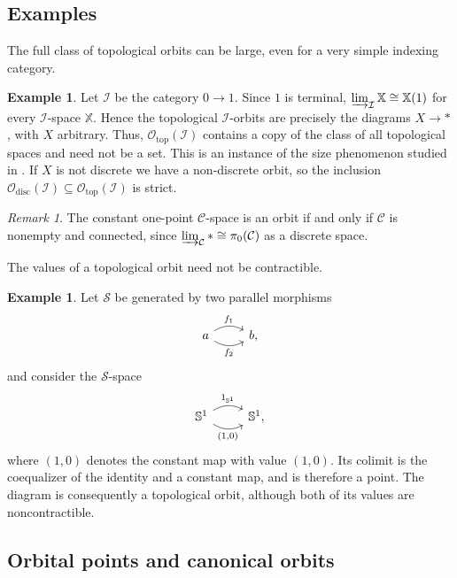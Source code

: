 \documentclass[12pt]{amsart}
\theoremstyle{definition}
\newtheorem{ex}[teo]{Example}
\theoremstyle{remark}
\newtheorem{rem}{Remark}
\numberwithin{figure}{section}%
\newcommand{\CC}{\mathcal{C}}
\newcommand{\X}{\mathbb{X}}
\begin{document}
\subsection{Examples}

The full class of topological orbits can be large, even for a very simple
indexing category.

\begin{ex}\label{ex:interval}
Let $\mathcal I$ be the category $0\to1$. Since $1$ is terminal,
$\varinjlim_{\mathcal I}\X\cong\X(1)$ for every $\mathcal I$-space
$\X$. Hence the topological $\mathcal I$-orbits are precisely the
diagrams $X\to *$, with $X$ arbitrary. Thus,
$\mathcal O_{\mathrm{top}}(\mathcal I)$ contains a copy of the class of
all topological spaces and need not be a set. This is an instance of the
size phenomenon studied in \cite{Chorny2003}. If $X$ is not discrete we have a non-discrete orbit, so the
inclusion
$\mathcal O_{\mathrm{disc}}(\mathcal I)
\subseteq\mathcal O_{\mathrm{top}}(\mathcal I)$
is strict.
\end{ex}

\begin{rem}
The constant one-point $\CC$-space is an orbit if and only if $\CC$ is
nonempty and connected, since
$\varinjlim_{\CC}*\cong\pi_0(\CC)$ as a discrete space.
\end{rem}

The values of a topological orbit need not be contractible.

\begin{ex}\label{ex:circunference_Category_orbit}
Let $\mathcal S$ be generated by two parallel morphisms
\[
\begin{tikzcd}
a
  \arrow[r,"f_1",bend left]
  \arrow[r,"f_2"',bend right]
&
b,
\end{tikzcd}
\]
and consider the $\mathcal S$-space
\[
\begin{tikzcd}
\mathbb S^1
  \arrow[r,"1_{\mathbb S^1}",bend left]
  \arrow[r,"{(1,0)}"',bend right]
&
\mathbb S^1,
\end{tikzcd}
\]
where $(1,0)$ denotes the constant map with value $(1,0)$. Its colimit
is the coequalizer of the identity and a constant map, and is therefore
a point. The diagram is consequently a topological orbit, although both
of its values are noncontractible. 
\end{ex}

\subsection{Orbital points and canonical orbits}
\end{document}
